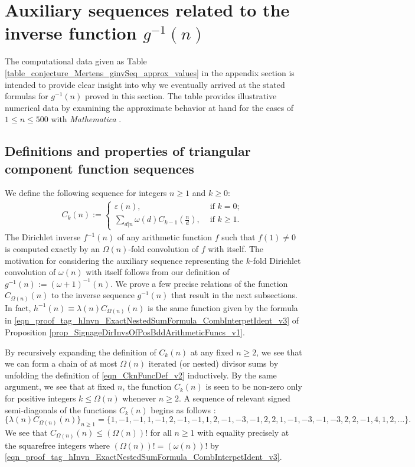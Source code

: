 \documentclass[11pt,reqno,a4letter]{article}
\numberwithin{figure}{section}
\numberwithin{table}{section}
\newcommand{\seqnum}[1]{\href{http://oeis.org/#1}{\color{ProcessBlue}{\underline{#1}}}}
\theoremstyle{plain}
\numberwithin{theorem}{section}
\theoremstyle{definition}
\begin{document}
\newpage
\section{Auxiliary sequences related to the inverse function $g^{-1}(n)$} 
\label{Section_InvFunc_PreciseExpsAndAsymptotics} 

The computational data given as Table \ref{table_conjecture_Mertens_ginvSeq_approx_values} 
in the appendix section is intended to 
provide clear insight into why we eventually arrived at the stated formulas for  
$g^{-1}(n)$ proved in this section. The table provides illustrative 
numerical data by examining the approximate behavior 
at hand for the cases of $1 \leq n \leq 500$ with \emph{Mathematica} 
\cite{SCHMIDT-MERTENS-COMPUTATIONS}. 

\subsection{Definitions and properties of triangular component function sequences} 

We define the following sequence for integers $n \geq 1$ and $k \geq 0$: 
\begin{align} 
\label{eqn_CknFuncDef_v2} 
C_k(n) := \begin{cases} 
     \varepsilon(n), & \text{ if $k = 0$; } \\ 
     \sum\limits_{d|n} \omega(d) C_{k-1}\left(\frac{n}{d}\right), & \text{ if $k \geq 1$. } 
     \end{cases} 
\end{align} 
The Dirichlet 
inverse $f^{-1}(n)$ of any arithmetic function $f$ such that $f(1) \neq 0$ is 
computed exactly by an $\Omega(n)$-fold convolution of $f$ with itself. 
The motivation for considering the auxiliary sequence representing the $k$-fold 
Dirichlet convolution of $\omega(n)$ with itself follows from our definition of 
$g^{-1}(n) := (\omega+1)^{-1}(n)$. 
We prove a few precise relations of the function $C_{\Omega(n)}(n)$ to the inverse 
sequence $g^{-1}(n)$ that result in the next subsections. 
In fact, 
$h^{-1}(n) \equiv \lambda(n) C_{\Omega(n)}(n)$ is the same function given by 
the formula in \eqref{eqn_proof_tag_hInvn_ExactNestedSumFormula_CombInterpetIdent_v3} of 
Proposition \ref{prop_SignageDirInvsOfPosBddArithmeticFuncs_v1}. 

By recursively expanding the definition of $C_k(n)$ 
at any fixed $n \geq 2$, we see that 
we can form a chain of at most $\Omega(n)$ iterated (or nested) divisor sums by 
unfolding the definition of \eqref{eqn_CknFuncDef_v2} inductively. 
By the same argument, we see that at fixed $n$, the function 
$C_k(n)$ is seen to be non-zero only for positive integers 
$k \leq \Omega(n)$ whenever $n \geq 2$. 
A sequence of relevant signed semi-diagonals of the functions $C_k(n)$ begins as follows 
\cite[\seqnum{A008480}]{OEIS}: 
\[
\{\lambda(n) C_{\Omega(n)}(n) \}_{n \geq 1} = \{
     1, -1, -1, 1, -1, 2, -1, -1, 1, 2, -1, -3, -1, 2, 2, 1, -1, -3, -1, 
     -3, 2, 2, -1, 4, 1, 2, \ldots \}. 
\]
We see that $C_{\Omega(n)}(n) \leq (\Omega(n))!$ for all $n \geq 1$ with 
equality precisely at the squarefree integers where 
$(\Omega(n))! = (\omega(n))!$ by 
\eqref{eqn_proof_tag_hInvn_ExactNestedSumFormula_CombInterpetIdent_v3}. 
\end{document}
